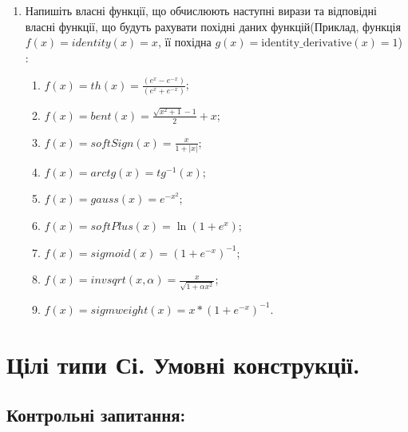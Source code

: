 \documentclass[a5paper,titlepage,openany,twoside,draft]{book_unv}%
\makeatletter
\newcommand{\xslalph}[1]{\expandafter\@xslalph\csname c@#1\endcsname}
\newcommand{\@xslalph}[1]{%
    \ifcase#1\or а\or б\or в\or г\or д\or e\or є\or ж\or з\or i%
    \or й\or к\or л\or м\or н\or о\or п\or р\or с\or т%
    \or у\or ф\or х\or ц\or ч\or ш\or ю\or я\or аа\or бб\or вв%
    \else\@ctrerr\fi%
}
\makeatother
\begin{document}
\begin{enumerate}
\item
  Напишіть власні функції, що обчислюють наступні вирази та відповідні
  власні функції, що будуть рахувати похідні даних функцій(Приклад,
  функція \(f(x) = identity(x) = x\), її похідна
  \(g(x) = \textrm{identity\_derivative}(x) = 1\)) :


  \begin{enumerate}[label=\xslalph*)]
  \item   \(f(x) = th(x) = \frac{(e^{x} - e^{-x})}{(e^{x} + e^{-x})}\);
\item \(f(x) = bent(x) = \frac{\sqrt{x^{2} + 1} - 1}{2} + x\);
\item \(f(x) = softSign(x) = \frac{x}{1 + |x|}\);
\item \(f(x) = arctg(x) = tg^{-1}(x)\);
\item\(f(x) = gauss(x) = e^{-x^{2}}\);
\item \(f(x) = softPlus(x) = \ln(1 + e^{x})\);
\item \(f(x) = sigmoid(x) = {(1 + e^{-x})}^{-1}\);
\item \(f(x) = invsqrt(x,\alpha) = \frac{x}{\sqrt{1 + \alpha x^{2}}}\);
\item\(f(x) = sigmweight(x) = x*{(1 + e^{-x})}^{-1}\).

 \end{enumerate}
\end{enumerate}


\chapter{ Цілі типи Сі. Умовні конструкції.}
%

\section{Контрольні запитання:}
\end{document}
